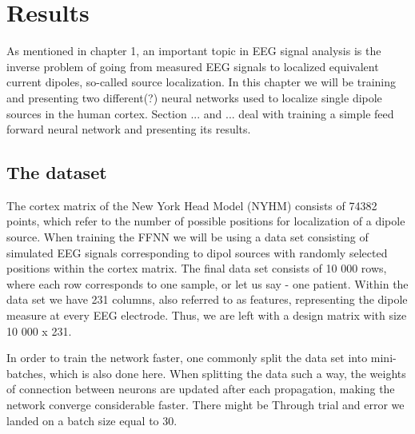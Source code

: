\documentclass[a4paper, UKenglish, 11pt]{uiomaster}
\begin{document}
\chapter{Results}
As mentioned in chapter 1, an important topic in EEG signal analysis is the inverse problem of going from measured EEG signals to localized equivalent current dipoles, so-called source localization. In this chapter we will be training and presenting two different(?) neural networks used to localize single dipole sources in the human cortex. Section ...  and ... deal with training a simple feed forward neural network and presenting its results.


\section{The dataset}
The cortex matrix of the New York Head Model (NYHM) consists of 74382 points, which refer to the number of possible positions for localization of a dipole source. When training the FFNN we will be using a data set consisting of simulated EEG signals corresponding to dipol sources with randomly selected positions within the cortex matrix. The final data set consists of 10 000 rows, where each row corresponds to one sample, or let us say - one patient. Within the data set we have 231 columns, also referred to as features, representing the dipole measure at every EEG electrode. Thus, we are left with a design matrix with size 10 000 x 231.

In order to train the network faster, one commonly split the data set into mini-batches, which is also done here. When splitting the data such a way, the weights of connection between neurons are updated after each propagation, making the network converge considerable faster. There might be Through trial and error we landed on a batch size equal to 30.


\end{document}
